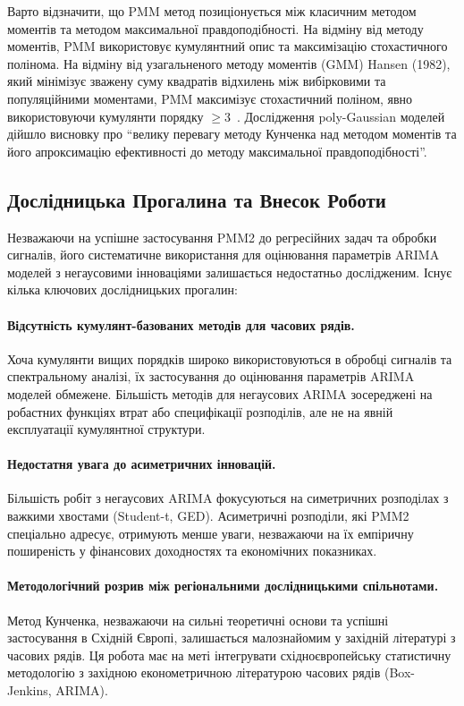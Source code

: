 \documentclass[12pt,a4paper]{article}
\begin{document}
Варто відзначити, що PMM метод позиціонується між класичним методом моментів та методом максимальної правдоподібності. На відміну від методу моментів, PMM використовує кумулянтний опис та максимізацію стохастичного полінома. На відміну від узагальненого методу моментів (GMM) Hansen (1982), який мінімізує зважену суму квадратів відхилень між вибірковими та популяційними моментами, PMM максимізує стохастичний поліном, явно використовуючи кумулянти порядку $\geq 3$~\cite{chepinoga2014polynomial}. Дослідження poly-Gaussian моделей дійшло висновку про ``велику перевагу методу Кунченка над методом моментів та його апроксимацію ефективності до методу максимальної правдоподібності''.

\subsection{Дослідницька Прогалина та Внесок Роботи}
\label{subsec:research_gap}

Незважаючи на успішне застосування PMM2 до регресійних задач та обробки сигналів, його систематичне використання для оцінювання параметрів ARIMA моделей з негаусовими інноваціями залишається недостатньо дослідженим. Існує кілька ключових дослідницьких прогалин:

\paragraph{Відсутність кумулянт-базованих методів для часових рядів.} Хоча кумулянти вищих порядків широко використовуються в обробці сигналів та спектральному аналізі, їх застосування до оцінювання параметрів ARIMA моделей обмежене. Більшість методів для негаусових ARIMA зосереджені на робастних функціях втрат або специфікації розподілів, але не на явній експлуатації кумулянтної структури.

\paragraph{Недостатня увага до асиметричних інновацій.} Більшість робіт з негаусових ARIMA фокусуються на симетричних розподілах з важкими хвостами (Student-t, GED). Асиметричні розподіли, які PMM2 спеціально адресує, отримують менше уваги, незважаючи на їх емпіричну поширеність у фінансових доходностях та економічних показниках.

\paragraph{Методологічний розрив між регіональними дослідницькими спільнотами.} Метод Кунченка, незважаючи на сильні теоретичні основи та успішні застосування в Східній Європі, залишається малознайомим у західній літературі з часових рядів. Ця робота має на меті інтегрувати східноєвропейську статистичну методологію з західною економетричною літературою часових рядів (Box-Jenkins, ARIMA).
\end{document}
